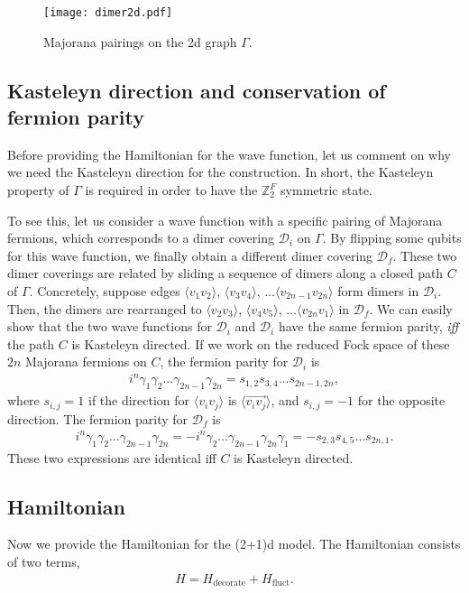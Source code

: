 \documentclass[12pt]{article}
\numberwithin{equation}{section}
\begin{document}
\begin{figure}[htb]
\centering
\texttt{[image: dimer2d.pdf]}
\caption{Majorana pairings on the 2d graph $\Gamma$.}
\label{fig:dimer2d}
\end{figure}

\subsection{Kasteleyn direction and conservation of fermion parity}
\label{subsec:kasteleyn}
Before providing the Hamiltonian for the wave function, let us comment on why we need the Kasteleyn direction for the construction.
In short, the Kasteleyn property of $\Gamma$ is required in order to have the $\mathbb{Z}_2^F$ symmetric state.

To see this, let us consider a wave function with a specific pairing of Majorana fermions, which corresponds to a dimer covering $\mathcal{D}_i$ on $\Gamma$. 
By flipping some qubits for this wave function, we finally obtain a different dimer covering $\mathcal{D}_f$. These two dimer coverings are related by sliding a sequence of dimers along a closed path $C$ of $\Gamma$. Concretely, suppose edges $\langle v_1v_2\rangle$, $\langle v_3v_4\rangle$, $\dots\langle v_{2n-1}v_{2n}\rangle$ form dimers in $\mathcal{D}_i$. Then, the dimers are rearranged to $\langle v_2v_3\rangle$, $\langle v_4v_5\rangle$, $\dots\langle v_{2n}v_{1}\rangle$ in $\mathcal{D}_f$. 
We can easily show that the two wave functions for $\mathcal{D}_i$ and $\mathcal{D}_i$ have the same fermion parity, \textit{iff} the path $C$ is Kasteleyn directed.
If we work on the reduced Fock space of these $2n$ Majorana fermions on $C$, the fermion parity for $\mathcal{D}_i$ is
\begin{align}
    i^n\gamma_1\gamma_2\dots\gamma_{2n-1}\gamma_{2n}=s_{1,2}s_{3,4}\dots s_{2n-1,2n},
\end{align}
where $s_{i,j}=1$ if the direction for $\langle v_iv_j\rangle$ is $\langle\overrightarrow{v_iv_j}\rangle$,
and $s_{i,j}=-1$ for the opposite direction.
The fermion parity for $\mathcal{D}_f$ is
\begin{align}
    i^n\gamma_1\gamma_2\dots\gamma_{2n-1}\gamma_{2n}=-i^n\gamma_2\dots\gamma_{2n-1}\gamma_{2n}\gamma_1=-s_{2,3}s_{4,5}\dots s_{2n,1}.
\end{align}
These two expressions are identical iff $C$ is Kasteleyn directed.


\subsection{Hamiltonian}
Now we provide the Hamiltonian for the (2+1)d model. The Hamiltonian consists of two terms,
\begin{align}
    H= H_{\mathrm{decorate}}+H_{\mathrm{fluct}}.
    \label{eq:ham2}
\end{align}
\end{document}
